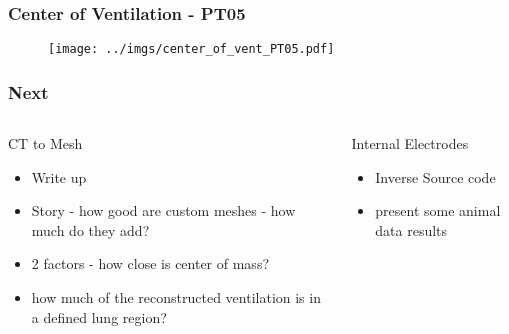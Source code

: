 \documentclass[10pt,    %
    english,            %
    xcolor=table,       %
    envcountsect,        %
    aspectratio=1610
]{beamer}
\begin{document}
\begin{frame}
 	\frametitle{Center of Ventilation - PT05}    
		\begin{figure}[H]
			\centering
			\texttt{[image: ../imgs/center\_of\_vent\_PT05.pdf]}
		\end{figure}
 \end{frame}




\begin{frame}
\frametitle{Next}    
\begin{columns}[c]
\begin{column}{0.5\textwidth}
	\alert{CT to Mesh}
\begin{itemize}
\item Write up
\item Story - how good are custom meshes - how much do they add?
\item 2 factors - how close is center of mass?
\item how much of the reconstructed ventilation is in a defined lung region?
\end{itemize}
\end{column}
\begin{column}{0.5\textwidth}
\alert{Internal Electrodes}
\begin{itemize}
\item Inverse Source code 
\item present some animal data results 
\end{itemize}
\end{column}
\end{columns}
\end{frame}


\begin{frame}
  \titlepage
\end{frame}

\end{document}
